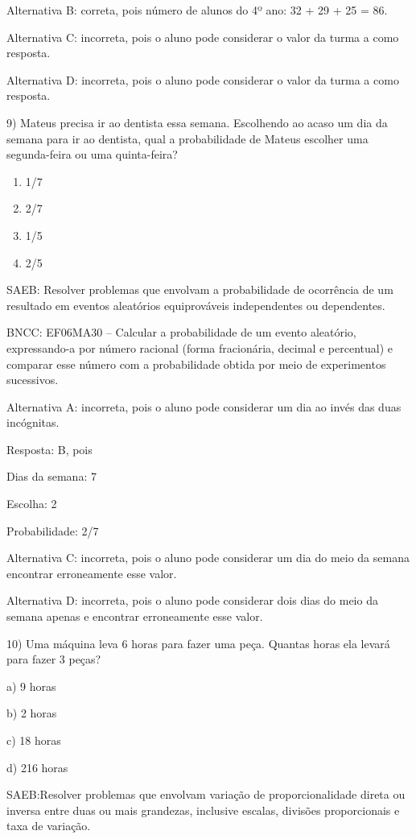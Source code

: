 Alternativa B: correta, pois número de alunos do 4º ano: 32 + 29 + 25 =
86.

Alternativa C: incorreta, pois o aluno pode considerar o valor da turma
a como resposta.

Alternativa D: incorreta, pois o aluno pode considerar o valor da turma
a como resposta.

9) Mateus precisa ir ao dentista essa semana. Escolhendo ao acaso um dia
da semana para ir ao dentista, qual a probabilidade de Mateus escolher
uma segunda-feira ou uma quinta-feira?

\begin{enumerate}
\def\labelenumi{\alph{enumi}.}
\item
  1/7
\item
  2/7
\item
  1/5
\item
  2/5
\end{enumerate}

SAEB: Resolver problemas que envolvam a probabilidade de ocorrência de
um resultado em eventos aleatórios equiprováveis independentes ou
dependentes.

BNCC: EF06MA30 -- Calcular a probabilidade de um evento aleatório,
expressando-a por número racional (forma fracionária, decimal e
percentual) e comparar esse número com a probabilidade obtida por meio
de experimentos sucessivos.

Alternativa A: incorreta, pois o aluno pode considerar um dia ao invés
das duas incógnitas.

Resposta: B, pois

Dias da semana: 7

Escolha: 2

Probabilidade: 2/7

Alternativa C: incorreta, pois o aluno pode considerar um dia do meio da
semana encontrar erroneamente esse valor.

Alternativa D: incorreta, pois o aluno pode considerar dois dias do meio
da semana apenas e encontrar erroneamente esse valor.

10) Uma máquina leva 6 horas para fazer uma peça. Quantas horas ela
levará para fazer 3 peças?

a) 9 horas

b) 2 horas

c) 18 horas

d) 216 horas

SAEB:Resolver problemas que envolvam variação de proporcionalidade
direta ou inversa entre duas ou mais grandezas, inclusive escalas,
divisões proporcionais e taxa de variação.

